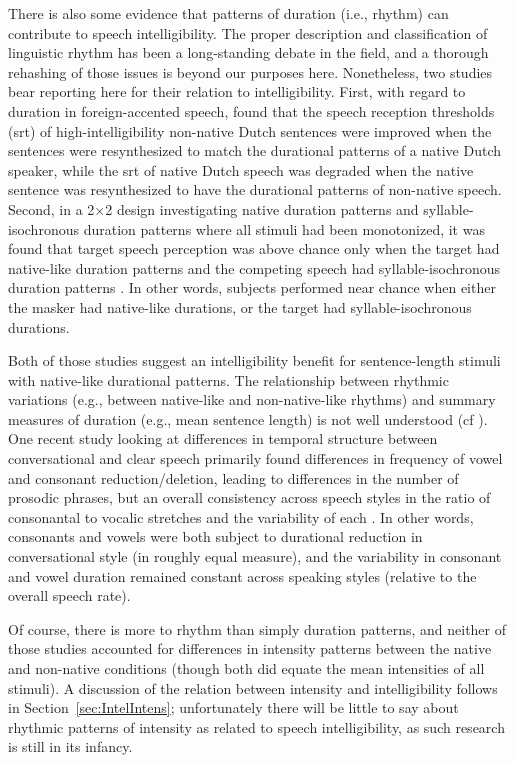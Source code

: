 There is also some evidence that patterns of duration (i.e., rhythm) can contribute to speech intelligibility.  The proper description and classification of linguistic rhythm has been a long-standing debate in the field, and a thorough rehashing of those issues is beyond our purposes here.\footnotemark{}  Nonetheless, two studies bear reporting here for their relation to intelligibility.  First, with regard to duration in foreign-accented speech, \citet{QueneVanDelft2010} found that the speech reception thresholds (\ac{srt}) of high-intelligibility non-native Dutch sentences were improved when the sentences were resynthesized to match the durational patterns of a native Dutch speaker, while the \ac{srt} of native Dutch speech was degraded when the native sentence was resynthesized to have the durational patterns of non-native speech.  Second, in a 2×2 design investigating native duration patterns and syllable-isochronous duration patterns where all stimuli had been monotonized, it was found that target speech perception was above chance only when the target had native-like duration patterns and the competing speech had syllable-isochronous duration patterns \citep{CushingDellwo2010}.  In other words, subjects performed near chance when either the masker had native-like durations, or the target had syllable-isochronous durations.  

Both of those studies suggest an intelligibility benefit for sentence-length stimuli with native-like durational patterns.  The relationship between rhythmic variations (e.g., between native-like and non-native-like rhythms) and summary measures of duration (e.g., mean sentence length) is not well understood (cf \citealt{Ramus2002}).  One recent study looking at differences in temporal structure between conversational and clear speech primarily found differences in frequency of vowel and consonant reduction/deletion, leading to differences in the number of prosodic phrases, but an overall consistency across speech styles in the ratio of consonantal to vocalic stretches and the variability of each \citep{SmiljanicBradlow2008}.  In other words, consonants and vowels were both subject to durational reduction in conversational style (in roughly equal measure), and the variability in consonant and vowel duration remained constant across speaking styles (relative to the overall speech rate).

Of course, there is more to rhythm than simply duration patterns, and neither of those studies accounted for differences in intensity patterns between the native and non-native conditions (though both did equate the mean intensities of all stimuli).  A discussion of the relation between intensity and intelligibility follows in Section~\ref{sec:IntelIntens}; unfortunately there will be little to say about rhythmic patterns of intensity as related to speech intelligibility, as such research is still in its infancy.  

